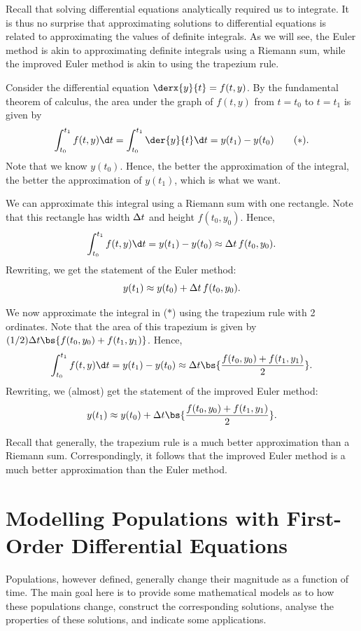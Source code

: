 Recall that solving differential equations analytically required us to integrate. It is thus no surprise that approximating solutions to differential equations is related to approximating the values of definite integrals. As we will see, the Euler method is akin to approximating definite integrals using a Riemann sum, while the improved Euler method is akin to using the trapezium rule.

Consider the differential equation $\derx{y}{t} = f(t, y)$. By the fundamental theorem of calculus, the area under the graph of $f(t, y)$ from $t = t_0$ to $t = t_1$ is given by \[\int_{t_0}^{t_1} f(t, y) \d t = \int_{t_0}^{t_1} \der{y}{t} \d t = y(t_1) - y(t_0) \tag{$\ast$}.\] Note that we know $y(t_0)$. Hence, the better the approximation of the integral, the better the approximation of $y(t_1)$, which is what we want.

We can approximate this integral using a Riemann sum with one rectangle. Note that this rectangle has width $\Delta t$ and height $f(t_0, y_0)$. Hence, \[\int_{t_0}^{t_1} f(t, y) \d t = y(t_1) - y(t_0) \approx \D t \, f(t_0, y_0).\] Rewriting, we get the statement of the Euler method: \[y(t_1) \approx y(t_0) + \Delta t \, f(t_0, y_0).\]

We now approximate the integral in ($\ast$) using the trapezium rule with 2 ordinates. Note that the area of this trapezium is given by $(1/2) \D t \bs{f(t_0, y_0) + f(t_1, y_1)}$. Hence, \[\int_{t_0}^{t_1} f(t, y) \d t = y(t_1) - y(t_0) \approx \D t \bs{\frac{f(t_0, y_0) +f(t_1, y_1)}{2}}.\] Rewriting, we (almost) get the statement of the improved Euler method: \[y(t_1) \approx y(t_0) + \D t \bs{\frac{f(t_0, y_0) +f(t_1, y_1)}{2}}.\]

Recall that generally, the trapezium rule is a much better approximation than a Riemann sum. Correspondingly, it follows that the improved Euler method is a much better approximation than the Euler method.

\section{Modelling Populations with First-Order Differential Equations}

Populations, however defined, generally change their magnitude as a function of time. The main goal here is to provide some mathematical models as to how these populations change, construct the corresponding solutions, analyse the properties of these solutions, and indicate some applications.

